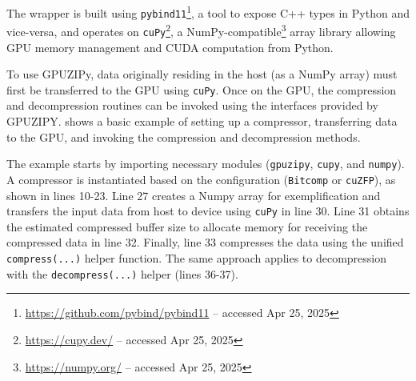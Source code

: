 \documentclass[Ingles]{ic-tese-v3}
\begin{document}
The wrapper is built using \texttt{pybind11}\footnote{\url{https://github.com/pybind/pybind11} -- accessed Apr 25, 2025}, a tool to expose C++ types in Python and vice-versa, and operates on \texttt{cuPy}\footnote{\url{https://cupy.dev/} -- accessed Apr 25, 2025}, a NumPy-compatible\footnote{\url{https://numpy.org/} -- accessed Apr 25, 2025} array library allowing GPU memory management and CUDA computation from Python.

To use GPUZIPy, data originally residing in the host (as a NumPy array) must first be transferred to the GPU using \texttt{cuPy}. Once on the GPU, the compression and decompression routines can be invoked using the interfaces provided by GPUZIPY.  shows a basic example of setting up a compressor, transferring data to the GPU, and invoking the compression and decompression methods.

The example starts by importing necessary modules (\texttt{gpuzipy}, \texttt{cupy}, and \texttt{numpy}). A compressor is instantiated based on the configuration (\texttt{Bitcomp} or \texttt{cuZFP}), as shown in lines 10-23. Line 27 creates a Numpy array for exemplification and transfers the input data from host to device using \texttt{cuPy} in line 30. Line 31 obtains the estimated compressed buffer size to allocate memory for receiving the compressed data in line 32. Finally, line 33 compresses the data using the unified \texttt{compress(...)} helper function. The same approach applies to decompression with the \texttt{decompress(...)} helper (lines 36-37).
\end{document}
